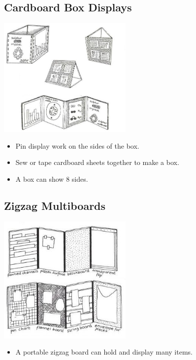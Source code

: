 \begin{multicols}{2}

\section{Cardboard Box Displays}

\begin{center}
\includegraphics[width=0.49\textwidth]{./img/vso/cardboard-box-2.jpg}
\end{center}

\begin{itemize}
\item Pin display work on the sides of
the box.
\item Sew or tape cardboard sheets
together to make a box.
\item A box can show 8 sides.
\end{itemize}


\subsection{Zigzag Multiboards}

\begin{center}
\includegraphics[width=0.49\textwidth]{./img/vso/zigzag.jpg}
\end{center}

\begin{itemize}
\item A portable zigzag board can hold and display many items.
\end{itemize}


\end{multicols}
